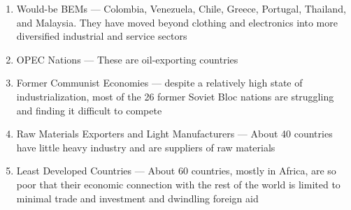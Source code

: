 \documentclass[12pt]{article}
\begin{document}
\begin{enumerate}
\begin{enumerate}
\begin{enumerate}
              \item Would-be BEMs — Colombia, Venezuela, Chile, Greece, Portugal, Thailand, and Malaysia. They have moved beyond clothing and electronics into more diversified industrial and service sectors

              \item OPEC Nations — These are oil-exporting countries

              \item Former Communist Economies — despite a relatively high state of industrialization, most of the 26 former Soviet Bloc nations are struggling and finding it difficult to compete

              \item Raw Materials Exporters and Light Manufacturers — About 40 countries have little heavy industry and are suppliers of raw materials

              \item Least Developed Countries — About 60 countries, mostly in Africa, are so poor that their economic connection with the rest of the world is limited to minimal trade and investment and dwindling foreign aid

            \end{enumerate}

        \end{enumerate}

    \end{enumerate}
\end{document}
